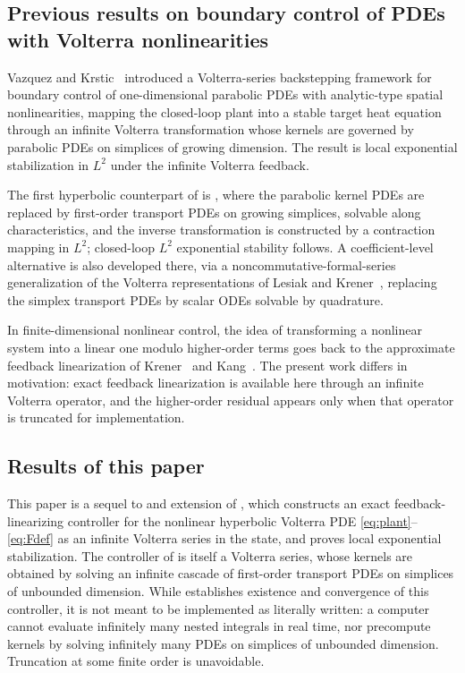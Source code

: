 \documentclass[amsthm]{autart}
\theoremstyle{plain}
\theoremstyle{definition}
\begin{document}
\subsection*{Previous results on boundary control of PDEs with Volterra nonlinearities}
Vazquez and Krstic~\cite{vazquez2008volterra1,vazquez2008volterra2} introduced a Volterra-series backstepping framework for boundary control of one-dimensional parabolic PDEs with analytic-type spatial nonlinearities, mapping the closed-loop plant into a stable target heat equation through an infinite Volterra transformation whose kernels are governed by parabolic PDEs on simplices of growing dimension. The result is local exponential stabilization in $L^2$ under the infinite Volterra feedback.

The first hyperbolic counterpart of \cite{vazquez2008volterra1,vazquez2008volterra2} is \cite{krstic2026feedbacklinearizationhyperbolicpdes}, where the parabolic kernel PDEs are replaced by first-order transport PDEs on growing simplices, solvable along characteristics, and the inverse transformation is constructed by a contraction mapping in $L^2$; closed-loop $L^2$ exponential stability follows. A coefficient-level alternative is also developed there, via a  noncommutative-formal-series generalization of the Volterra representations of Lesiak and Krener~\cite{1101898}, replacing the simplex transport PDEs by scalar ODEs solvable by quadrature.

In finite-dimensional nonlinear control, the idea of transforming a nonlinear system into a linear one modulo higher-order terms goes back to the approximate feedback linearization of Krener~\cite{Krener1984ApproximateLinearization} and Kang~\cite{Kang1994ApproximateLinearization}. The present work differs in motivation: exact feedback linearization is available here through an infinite Volterra operator, and the higher-order residual appears only when that operator is truncated for implementation.

\subsection*{Results of this paper}
This paper is a sequel to and extension of \cite{krstic2026feedbacklinearizationhyperbolicpdes}, which constructs an exact feedback-linearizing controller for the nonlinear hyperbolic Volterra PDE \eqref{eq:plant}--\eqref{eq:Fdef} as an infinite Volterra series in the state, and proves local exponential stabilization. The controller of \cite{krstic2026feedbacklinearizationhyperbolicpdes} is itself a Volterra series, whose kernels are obtained by solving an infinite cascade of first-order transport PDEs on simplices of unbounded dimension. While \cite{krstic2026feedbacklinearizationhyperbolicpdes} establishes existence and convergence of this controller, it is not meant to be implemented as literally written: a computer cannot evaluate infinitely many nested integrals in real time, nor precompute kernels by solving infinitely many PDEs on simplices of unbounded dimension. Truncation at some finite order is unavoidable.
\end{document}
